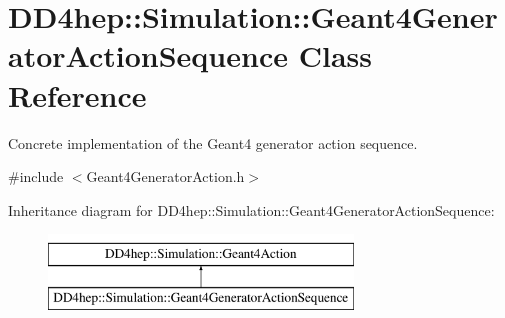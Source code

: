 \hypertarget{class_d_d4hep_1_1_simulation_1_1_geant4_generator_action_sequence}{}\section{D\+D4hep\+:\+:Simulation\+:\+:Geant4\+Generator\+Action\+Sequence Class Reference}
\label{class_d_d4hep_1_1_simulation_1_1_geant4_generator_action_sequence}


Concrete implementation of the Geant4 generator action sequence.  




{\ttfamily \#include $<$Geant4\+Generator\+Action.\+h$>$}

Inheritance diagram for D\+D4hep\+:\+:Simulation\+:\+:Geant4\+Generator\+Action\+Sequence\+:\begin{figure}[H]
\begin{center}
\leavevmode
\includegraphics[height=2.000000cm]{class_d_d4hep_1_1_simulation_1_1_geant4_generator_action_sequence}
\end{center}
\end{figure}
